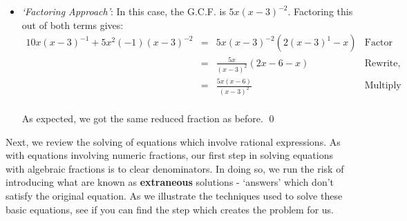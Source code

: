 \documentclass{ximera}
\begin{document}
\begin{example}
\begin{explanation}
\begin{enumerate}
\begin{itemize}
\item  \textit{`Factoring Approach'}: In this case, the G.C.F. is $5x(x-3)^{-2}$.  Factoring this out of both terms gives: \[ \begin{array}{rclr}

10x(x-3)^{-1} + 5x^2(-1)(x-3)^{-2} & = & 5x(x-3)^{-2}(2(x-3)^{1} - x) & \text{Factor} \\  
                                  & = & \frac{5x}{(x-3)^2} (2x-6 - x) & \text{Rewrite, distribute}\\  
																	& = & \frac{5x(x-6)}{(x-3)^2} & \text{Multiply}\\ \end{array}\]

As expected, we got the same reduced fraction as before. \qed
\end{itemize}
																
\end{enumerate}
\end{explanation}
\end{example}


Next, we review the solving of equations which involve rational expressions.  As with equations involving numeric fractions, our first step in solving equations with algebraic fractions is to clear denominators.  In doing so, we run the risk of introducing what are known as \textbf{extraneous} solutions - `answers' which don't satisfy the original equation.  As we illustrate the techniques used to solve these basic equations, see if you can find the step which creates the problem for us.
\end{document}
